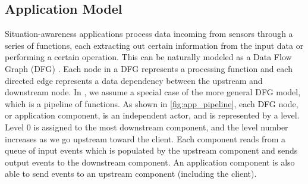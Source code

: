 \subsection{Application Model}
\label{sec:oneedge_app_model}
Situation-awareness applications process data incoming from sensors through a series of functions, each extracting out certain information from the input data or performing a certain operation. This can be naturally modeled as a Data Flow Graph (DFG) \cite{dfg}. Each node in a DFG represents a processing function and each directed edge represents a data dependency between the upstream and downstream node. In \oneedge{}, we assume a special case of the more general DFG model, which is a pipeline of functions. As shown in \cref{fig:app_pipeline}, each DFG node, or application component, is an independent actor, and is represented by a level. Level 0 is assigned to the most downstream component, and the level number increases as we go upstream toward the client. Each component reads from a queue of input events which is populated by the upstream component and sends output events to the downstream component. An application component is also able to send events to an upstream component (including the client).

